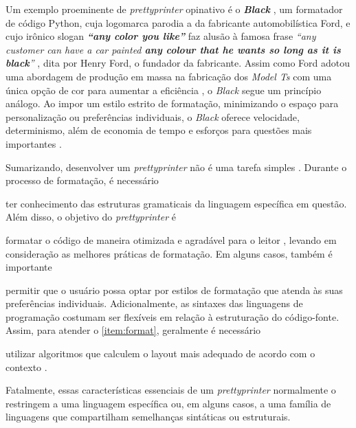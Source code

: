 \documentclass
  [11pt,a4paper,english,brazil,openright,sumario=tradicional,twoside]
  {abntex2}
\begin{document}
  Um exemplo proeminente de \textit{prettyprinter} opinativo é o
  \textit{\textbf{Black}} \cite{black-2023-black}, um formatador de código
  Python, cuja logomarca parodia a da fabricante automobilística Ford, e cujo
  irônico slogan \textit{\textbf{``any color you like''}} faz alusão à famosa
  frase
  \textit
    {%
      ``any customer can have a car painted \textbf{any colour that he wants so
      long as it is black}''}
  \cite[p. 72, grifo nosso]{ford-1922-my}, dita por Henry Ford, o fundador da
  fabricante. Assim como Ford adotou uma abordagem de produção em massa na
  fabricação dos \textit{Model Ts} com uma única opção de cor para aumentar a
  eficiência \cite{ford-1922-my}, o \textit{Black} segue um princípio análogo.
  Ao impor um estilo estrito de formatação, minimizando o espaço para
  personalização ou preferências individuais, o \textit{Black} oferece
  velocidade, determinismo, além de economia de tempo e esforços para questões
  mais importantes \cite{black-2023-black}.

  Sumarizando, desenvolver um \textit{prettyprinter} não é uma tarefa simples
  \cite[55]{hughes-1995-design}. Durante o processo de formatação, é necessário
  \begin{inparaenum}
    \item ter conhecimento das estruturas gramaticais da linguagem específica
          em questão. Além disso, o objetivo do \textit{prettyprinter} é
    \item \label{item:format} formatar o código de maneira otimizada e
          agradável para o leitor \cite[55]{hughes-1995-design}, levando em
          consideração as melhores práticas de formatação. Em alguns casos,
          também é importante
    \item permitir que o usuário possa optar por estilos de formatação que
          atenda às suas preferências individuais. Adicionalmente, as sintaxes
          das linguagens de programação costumam ser flexíveis em relação à
          estruturação do código-fonte. Assim, para atender o
          \cref{item:format}, geralmente é necessário
    \item utilizar algoritmos que calculem o layout mais adequado de acordo com
          o contexto
          \cites
            [12]{jasper-2023-clang}
            {goldstein-1973-pretty}
            {hughes-1995-design}
            {yelland-2015-new}.
  \end{inparaenum}
  Fatalmente, essas características essenciais de um \textit{prettyprinter}
  normalmente o restringem a uma linguagem específica ou, em alguns casos, a
  uma família de linguagens que compartilham semelhanças sintáticas ou
  estruturais.
\end{document}
